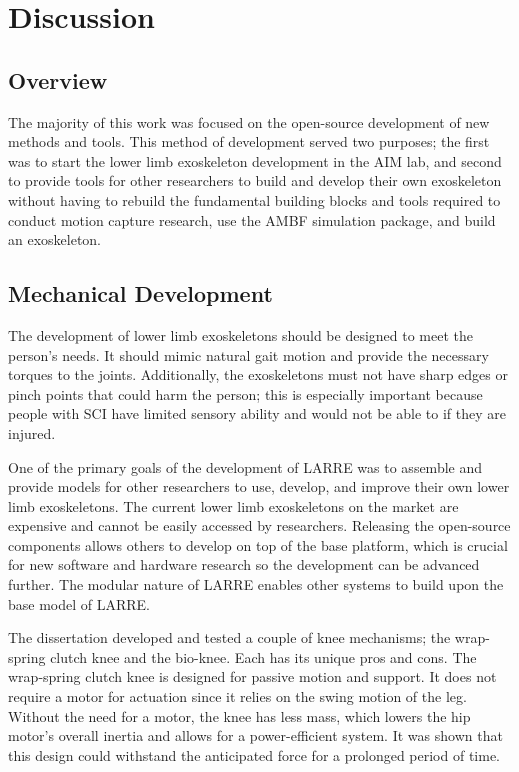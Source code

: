 \chapter{Discussion}

\section{Overview}

The majority of this work was focused on the open-source development of new methods and tools. This method of development served two purposes; the first was to start the lower limb exoskeleton development in the AIM lab, and second to provide tools for other researchers to build and develop their own exoskeleton without having to rebuild the fundamental building blocks and tools required to conduct motion capture research, use the AMBF simulation package, and build an exoskeleton. 

\section{Mechanical Development}

The development of lower limb exoskeletons should be designed to meet the person's needs. It should mimic natural gait motion and provide the necessary torques to the joints. Additionally, the exoskeletons must not have sharp edges or pinch points that could harm the person; this is especially important because people with SCI have limited sensory ability and would not be able to if they are injured. 

One of the primary goals of the development of LARRE was to assemble and provide models for other researchers to use, develop, and improve their own lower limb exoskeletons. The current lower limb exoskeletons on the market are expensive and cannot be easily accessed by researchers. Releasing the open-source components allows others to develop on top of the base platform, which is crucial for new software and hardware research so the development can be advanced further. The modular nature of LARRE enables other systems to build upon the base model of LARRE. 

The dissertation developed and tested a couple of knee mechanisms; the wrap-spring clutch knee and the bio-knee. Each has its unique pros and cons. The wrap-spring clutch knee is designed for passive motion and support. It does not require a motor for actuation since it relies on the swing motion of the leg. Without the need for a motor, the knee has less mass, which lowers the hip motor's overall inertia and allows for a power-efficient system. It was shown that this design could withstand the anticipated force for a prolonged period of time.   

